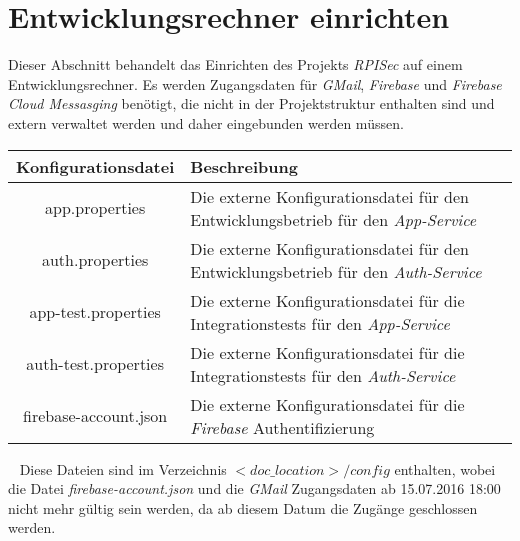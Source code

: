 \documentclass[]{article}
\begin{document}
\section{Entwicklungsrechner einrichten}
Dieser Abschnitt behandelt das Einrichten des Projekts \emph{RPISec} auf einem Entwicklungsrechner. Es werden Zugangsdaten für \emph{GMail}, \emph{Firebase} und \emph{Firebase Cloud Messasging} benötigt, die nicht in der Projektstruktur enthalten sind und extern verwaltet werden und daher eingebunden werden müssen.
{\renewcommand{\arraystretch}{2}%
\begin{center}
	\begin{tabular}{| c | l | p{7cm} |}
		\hline
		\textbf{Konfigurationsdatei} & \textbf{Beschreibung}  \\ \hline
		app.properties & Die externe Konfigurationsdatei für den Entwicklungsbetrieb für den \emph{App-Service} \\ \hline
		auth.properties & Die externe Konfigurationsdatei für den Entwicklungsbetrieb für den \emph{Auth-Service} \\ \hline
		app-test.properties & Die externe Konfigurationsdatei für die Integrationstests für den \emph{App-Service} \\ \hline
		auth-test.properties & Die externe Konfigurationsdatei für die Integrationstests für den \emph{Auth-Service} \\ \hline
		firebase-account.json & Die externe Konfigurationsdatei für die \emph{Firebase} Authentifizierung \\ \hline
	\end{tabular}
\end{center}
\ \newline
Diese Dateien sind im Verzeichnis \emph{$<doc\_location>/config$} enthalten, wobei die Datei \emph{firebase-account.json} und die \emph{GMail} Zugangsdaten ab 15.07.2016 18:00 nicht mehr gültig sein werden, da ab diesem Datum die Zugänge geschlossen werden.

}
\end{document}
